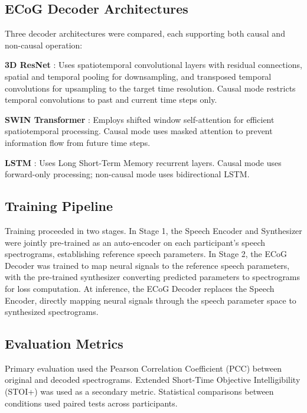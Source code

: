 \documentclass[11pt]{article}
\begin{document}
\subsection{ECoG Decoder Architectures}

Three decoder architectures were compared, each supporting both causal and non-causal operation:

\textbf{3D ResNet} \citep{he2016}: Uses spatiotemporal convolutional layers with residual connections, spatial and temporal pooling for downsampling, and transposed temporal convolutions for upsampling to the target time resolution. Causal mode restricts temporal convolutions to past and current time steps only.

\textbf{SWIN Transformer} \citep{liu2021}: Employs shifted window self-attention for efficient spatiotemporal processing. Causal mode uses masked attention to prevent information flow from future time steps.

\textbf{LSTM} \citep{hochreiter1997}: Uses Long Short-Term Memory recurrent layers. Causal mode uses forward-only processing; non-causal mode uses bidirectional LSTM.

\subsection{Training Pipeline}

Training proceeded in two stages. In Stage 1, the Speech Encoder and Synthesizer were jointly pre-trained as an auto-encoder on each participant's speech spectrograms, establishing reference speech parameters. In Stage 2, the ECoG Decoder was trained to map neural signals to the reference speech parameters, with the pre-trained synthesizer converting predicted parameters to spectrograms for loss computation. At inference, the ECoG Decoder replaces the Speech Encoder, directly mapping neural signals through the speech parameter space to synthesized spectrograms.

\subsection{Evaluation Metrics}

Primary evaluation used the Pearson Correlation Coefficient (PCC) between original and decoded spectrograms. Extended Short-Time Objective Intelligibility (STOI+) \citep{taal2011} was used as a secondary metric. Statistical comparisons between conditions used paired tests across participants.
\end{document}
